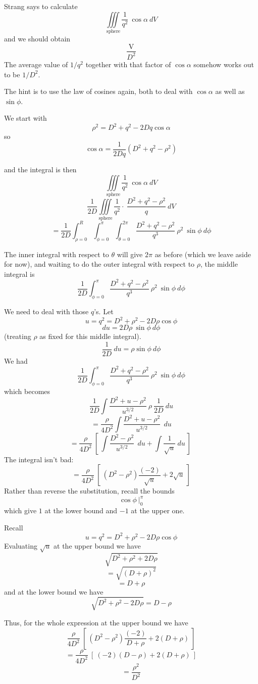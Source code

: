 \documentclass[11pt, oneside]{article}   	%
\begin{document}
Strang says to calculate
\[  \iiint\limits_{\text{sphere}} \frac{1}{q^2} \ \cos \alpha \ dV \]
and we should obtain
\[ \frac{\text{V}}{D^2} \]
The average value of $1/q^2$ together with that factor of $\cos \alpha$ somehow works out to be $1/D^2$.

The hint is to use the law of cosines again, both to deal with $\cos \alpha$ as well as $\sin \phi$.

We start with
\[ \rho^2 = D^2 + q^2 -2Dq \cos \alpha \]
so 
\[ \cos \alpha = \frac{1}{2Dq} (D^2 + q^2 -\rho^2) \]

and the integral is then
\[  \iiint\limits_{\text{sphere}} \frac{1}{q^2} \ \cos \alpha \  dV \]
\[  \frac{1}{2D}  \iiint\limits_{\text{sphere}} \frac{1}{q^2} \cdot \ \frac{D^2 + q^2 -\rho^2}{q}  \ dV \]
\[  = \frac{1}{2D}  \int_{\rho = 0}^{R} \int_{\phi = 0}^{\pi} \int_{\theta=0}^{2\pi} \frac{D^2 + q^2 -\rho^2}{q^3}  \ \rho^2 \ \sin \phi  \ d \phi \]

The inner integral with respect to $\theta$ will give $2 \pi$ as before (which we leave aside for now), and waiting to do the outer integral with respect to $\rho$, the middle integral is
\[ \frac{1}{2D} \int_{\phi = 0}^{\pi}  \frac{D^2 + q^2 -\rho^2}{q^3} \ \rho^2 \ \sin \phi \ d \phi \]

We need to deal with those $q$'s.  Let 
\[ u = q^2 = D^2 + \rho^2 - 2 D \rho \cos \phi \]
\[ du = 2 D \rho \ \sin \phi \ d \phi \]
(treating $\rho$ as fixed for this middle integral).
\[ \frac{1}{2D} \ du = \rho \sin \phi \ d \phi \]
We had
\[ \frac{1}{2D} \int_{\phi = 0}^{\pi}  \frac{D^2 + q^2 -\rho^2}{q^3} \ \rho^2 \ \sin \phi \ d \phi \]
which becomes
\[ \frac{1}{2D}  \int  \frac{D^2 + u -\rho^2}{u^{3/2}} \ \rho \ \frac{1}{2D} \ du \]
\[ = \frac{\rho}{4D^2}  \int  \frac{D^2 + u -\rho^2}{u^{3/2}} \  \ du \]
\[ = \frac{\rho}{4D^2} \ [ \ \int  \frac{D^2 -\rho^2}{u^{3/2}} \  \ du + \int  \frac{1}{\sqrt{u}} \ du \ ] \  \]
The integral isn't bad:
\[ = \frac{\rho}{4D^2} \ [ \ (D^2 - \rho^2) \frac{(-2)}{\sqrt{u}} + 2 \sqrt{u}   \ ] \]
Rather than reverse the substitution, recall the bounds
\[ \cos \phi \ \bigg |_0^{\pi} \]
which give $1$ at the lower bound and $-1$ at the upper one.

Recall 
\[ u = q^2 = D^2 + \rho^2 - 2 D \rho \cos \phi \]
Evaluating $\sqrt{u}$ at the upper bound we have
\[ \sqrt{D^2 + \rho^2 + 2 D \rho} \]
\[ = \sqrt{(D + \rho)^2} \]
\[ = D + \rho \]
and at the lower bound we have
\[ \sqrt{D^2 + \rho^2 - 2 D \rho} = D - \rho \]

Thus, for the whole expression at the upper bound we have
\[ \frac{\rho}{4D^2} \ [ \ (D^2 - \rho^2) \frac{(-2)}{D + \rho} + 2 (D + \rho) \ ] \]
\[ =  \frac{\rho}{4D^2} \ [ \ (-2)(D - \rho) + 2 (D + \rho) \ ] \]
\[ = \frac{\rho^2}{D^2} \]
\end{document}
